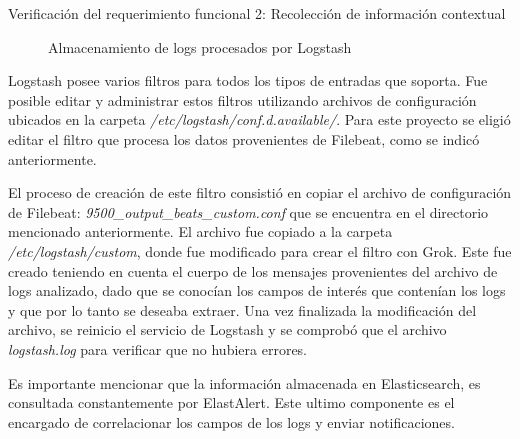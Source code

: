\begin{section}{Verificación del requerimiento funcional 2: Recolección de información contextual}
\begin{figure}[H]
        \caption{Almacenamiento de logs procesados por Logstash}
        \label{fig:iter2_logs_filtrados}
    \end{figure}
    Logstash posee varios filtros para todos los tipos de entradas que soporta. 
    Fue posible editar y administrar estos filtros utilizando archivos de configuración ubicados en la carpeta \textit{/etc/logstash/conf.d.available/}. Para este proyecto se eligió editar el filtro que procesa los datos provenientes de Filebeat, como se indicó anteriormente.\par
    El proceso de creación de este filtro consistió en copiar el archivo de configuración de Filebeat: \textit{9500\_output\_beats\_custom.conf} que se encuentra en el directorio mencionado anteriormente. El archivo fue copiado a la carpeta \textit{/etc/logstash/custom}, donde fue modificado para crear el filtro con Grok. Este fue creado teniendo en cuenta el cuerpo de los mensajes provenientes del archivo de logs analizado, dado que se conocían los campos de interés que contenían los logs y que por lo tanto se deseaba extraer. Una vez finalizada la modificación del archivo, se reinicio el servicio de Logstash y se comprobó que el archivo \textit{logstash.log} para verificar que no hubiera errores.\par
    Es importante mencionar que la información almacenada en Elasticsearch, es consultada constantemente por ElastAlert. Este ultimo componente es el encargado de correlacionar los campos de los logs y enviar notificaciones.

    \end{section}
    
